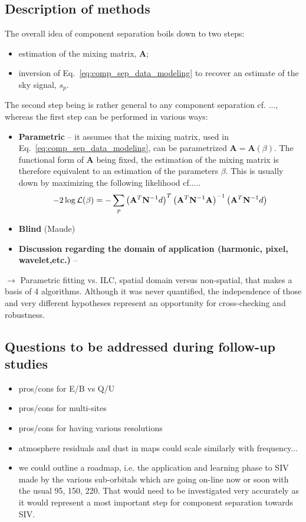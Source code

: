 \subsection{Description of methods}
The overall idea of component separation boils down to two steps:
\begin{itemize}
	\item estimation of the mixing matrix, $\mathbf{A}$;
	\item inversion of Eq.~\ref{eq:comp_sep_data_modeling} to recover an estimate of the sky signal, $s_p$.
\end{itemize}
The second step being is rather general to any component separation cf. ..., whereas the first step can be performed in various ways:
\begin{itemize}
	\item \textbf{Parametric} -- it assumes that the mixing matrix, used in Eq.~\ref{eq:comp_sep_data_modeling}, can be parametrized $\mathbf{A} = \mathbf{A}(\beta)$. The functional form of $\mathbf{A}$ being fixed, the estimation of the mixing matrix is therefore equivalent to an estimation of the parameters $\beta$. This is usually down by maximizing the following likelihood cf.....
	\begin{eqnarray}
		\centering
			-2\log \mathcal{L}(\beta) = - \sum_p \left( \mathbf{A}^T\mathbf{N}^{-1} d\right)^T\left( \mathbf{A}^T\mathbf{N}^{-1} \mathbf{A}\right)^{-1}\left( \mathbf{A}^T\mathbf{N}^{-1} d\right)
	\end{eqnarray}
	\item \textbf{Blind} (Maude)
	\item \textbf{Discussion regarding the domain of application (harmonic, pixel, wavelet,etc.)} -- 
\end{itemize}

$\rightarrow$ Parametric fitting vs. ILC, spatial domain versus non-spatial, that makes a basis of 4 algorithms. Although it was never quantified, the independence of those and very different hypotheses represent an opportunity for cross-checking and robustness.

\subsection{Questions to be addressed during follow-up studies}
\begin{itemize}
	\item pros/cons for E/B vs Q/U
	\item pros/cons for multi-sites
	\item pros/cons for having various resolutions
	\item atmosphere residuals and dust in maps could scale similarly with frequency...
	\item we could outline a roadmap, i.e. the application and learning phase to SIV made by the various sub-orbitals which are going on-line now or soon with the usual 95, 150, 220. That would need to be investigated very accurately as it would represent a most important step for component separation
towards SIV.
\end{itemize}





%



